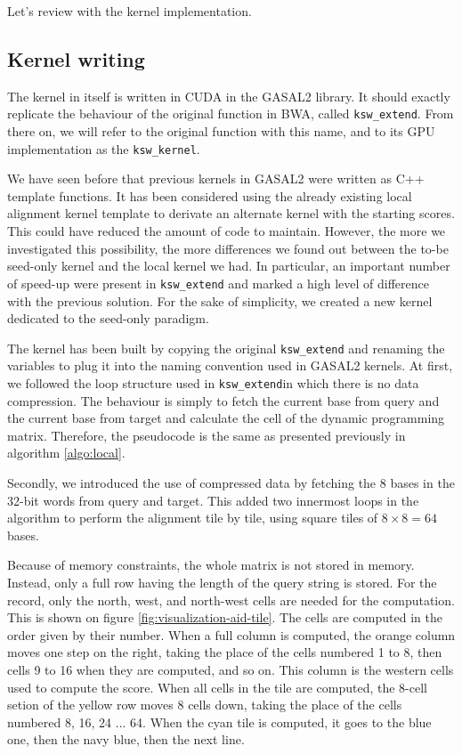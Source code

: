 Let's review with the kernel implementation.

\subsection{Kernel writing}
The kernel in itself is written in CUDA in the GASAL2 library. It should exactly replicate the behaviour of the original function in BWA, called \verb|ksw_extend|. From there on, we will refer to the original function with this name, and to its GPU implementation as the \verb|ksw_kernel|.

We have seen before that previous kernels in GASAL2 were written as C++ template functions. It has been considered using the already existing local alignment kernel template to derivate an alternate kernel with the starting scores. This could have reduced the amount of code to maintain. However, the more we investigated this possibility, the more differences we found out between the to-be seed-only kernel and the local kernel we had. In particular, an important number of speed-up were present in \verb|ksw_extend| and marked a high level of difference with the previous solution. For the sake of simplicity, we created a new kernel dedicated to the seed-only paradigm.

The kernel has been built by copying the original \verb|ksw_extend| and renaming the variables to plug it into the naming convention used in GASAL2 kernels. At first, we followed the loop structure used in \verb|ksw_extend|in which there is no data compression. The behaviour is simply to fetch the current base from query and the current base from target and calculate the cell of the dynamic programming matrix. Therefore, the pseudocode is the same as presented previously in algorithm \ref{algo:local}.

Secondly, we introduced the use of compressed data by fetching the 8 bases in the 32-bit words from query and target. This added two innermost loops in the algorithm to perform the alignment tile by tile, using square tiles of $8 \times 8 = 64$ bases.

Because of memory constraints, the whole matrix is not stored in memory. Instead, only a full row having the length of the query string is stored. For the record, only the north, west, and north-west cells are needed for the computation. This is shown on figure \ref{fig:visualization-aid-tile}. The cells are computed in the order given by their number. When a full column is computed, the orange column moves one step on the right, taking the place of the cells numbered 1 to 8, then cells 9 to 16 when they are computed, and so on. This column is the western cells used to compute the score. When all cells in the tile are computed, the 8-cell setion of the yellow row moves 8 cells down, taking the place of the cells numbered 8, 16, 24 ... 64. When the cyan tile is computed, it goes to the blue one, then the navy blue, then the next line.

